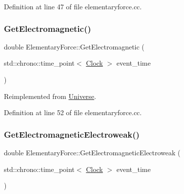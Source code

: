 Definition at line 47 of file elementaryforce.\+cc.

\mbox{\label{class_elementary_force_a2c8bc3226f42710717775c73eee1644e}} 
\subsubsection{\texorpdfstring{Get\+Electromagnetic()}{GetElectromagnetic()}}
{\footnotesize\ttfamily double Elementary\+Force\+::\+Get\+Electromagnetic (\begin{DoxyParamCaption}\item[{std\+::chrono\+::time\+\_\+point$<$ \mbox{\hyperlink{universe_8h_a0ef8d951d1ca5ab3cfaf7ab4c7a6fd80}{Clock}} $>$}]{event\+\_\+time }\end{DoxyParamCaption})\hspace{0.3cm}{\ttfamily [virtual]}}



Reimplemented from \mbox{\hyperlink{class_universe_a63b850ef3f3394313353109d222bf5d1}{Universe}}.



Definition at line 52 of file elementaryforce.\+cc.

\mbox{\label{class_elementary_force_a58e503f2f3a7410f034a2a04bca560d1}} 
\subsubsection{\texorpdfstring{Get\+Electromagnetic\+Electroweak()}{GetElectromagneticElectroweak()}}
{\footnotesize\ttfamily double Elementary\+Force\+::\+Get\+Electromagnetic\+Electroweak (\begin{DoxyParamCaption}\item[{std\+::chrono\+::time\+\_\+point$<$ \mbox{\hyperlink{universe_8h_a0ef8d951d1ca5ab3cfaf7ab4c7a6fd80}{Clock}} $>$}]{event\+\_\+time }\end{DoxyParamCaption})\hspace{0.3cm}{\ttfamily [virtual]}}



